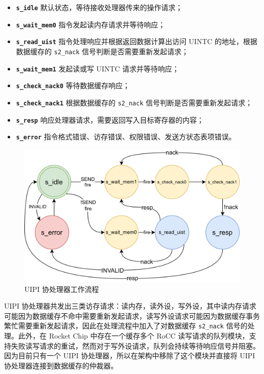 \begin{itemize}
    \item \texttt{\textbf{s\_idle}} 默认状态，等待接收处理器传来的操作请求；
    \item \texttt{\textbf{s\_wait\_mem0}} \Iuipisend 指令发起读内存请求并等待响应；
    \item \texttt{\textbf{s\_read\_uist}} \Iuipisend 指令处理响应并根据返回数据计算出访问 UINTC 的地址，根据数据缓存的 \texttt{s2\_nack} 信号判断是否需要重新发起请求；
    \item \texttt{\textbf{s\_wait\_mem1}} 发起读或写 UINTC 请求并等待响应；
    \item \texttt{\textbf{s\_check\_nack0}} 等待数据缓存响应；
    \item \texttt{\textbf{s\_check\_nack1}} 根据数据缓存的 \texttt{s2\_nack} 信号判断是否需要重新发起请求；
    \item \texttt{\textbf{s\_resp}} 响应处理器请求，\Iuipiread 需要返回写入目标寄存器的内容；
    \item \texttt{\textbf{s\_error}} 指令格式错误、访存错误、权限错误、发送方状态表项错误。
\end{itemize}

\begin{figure}
    \centering
    \includegraphics[width=1\linewidth]{figures/uipi.png}
    \caption{UIPI 协处理器工作流程}
    \label{fig:uintr3}
\end{figure}

UIPI 协处理器共发出三类访存请求：读内存，读外设，写外设，其中读内存请求可能因为数据缓存不命中需要重新发起请求，读写外设请求可能因为数据缓存事务繁忙需要重新发起请求，因此在处理流程中加入了对数据缓存 \texttt{s2\_nack} 信号的处理。此外，在 Rocket Chip 中存在一个缓存多个 RoCC 读写请求的队列模块，支持失败读写请求的重试，然而对于写外设请求，队列会持续等待响应信号并阻塞。因为目前只有一个 UIPI 协处理器，所以在架构中移除了这个模块并直接将 UIPI 协处理器连接到数据缓存的仲裁器。

